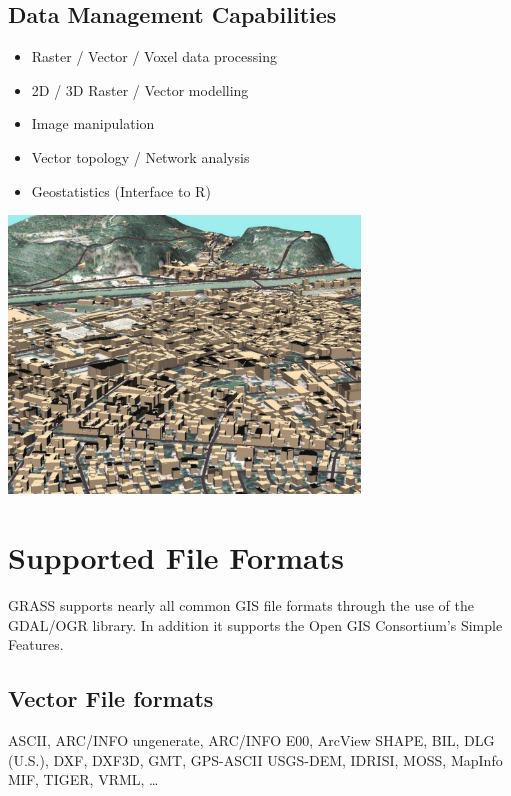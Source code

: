 \documentclass[notumble,a4paper,10pt,nofoldmark]{leaflet}
\newenvironment{myfig}[1][0pt plus 1.5ex minus .5ex]{\par\vspace*{#1}\begin{minipage}{\textwidth}\centering}{\end{minipage}}
\begin{document}
\subsection{Data Management Capabilities}

\begin{itemize}
\item Raster / Vector / Voxel data processing
\item 2D / 3D Raster / Vector modelling
\item Image manipulation
\item Vector topology / Network analysis
\item Geostatistics (Interface to R)
\end{itemize}

\begin{myfig}[1ex]
\includegraphics[width=0.7\textwidth]{trento3d}
\end{myfig}

\section{Supported File Formats}

GRASS supports nearly all common GIS file formats through the use of the GDAL/OGR library. In addition it supports the Open GIS Consortium's Simple Features.

\subsection{Vector File formats}
ASCII, ARC/INFO ungenerate, ARC/INFO E00, Arc\-View SHAPE, BIL, DLG (U.S.), DXF, DXF3D, GMT, GPS-ASCII USGS-DEM, IDRISI, MOSS, MapInfo MIF, TIGER, VRML, \dots
\end{document}
